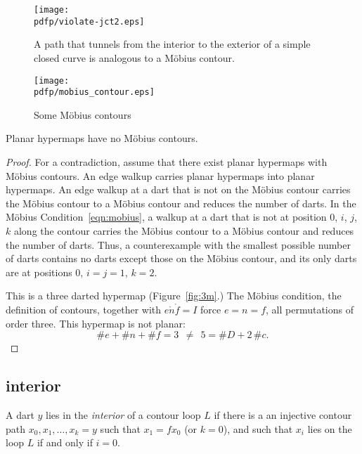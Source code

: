 \begin{figure}[htb]
  \centering
  \texttt{[image: \\pdfp/violate-jct2.eps]}
  \caption{A path that tunnels from the interior to the exterior
   of a simple closed curve
   is analogous to a M\"obius contour.}
  \label{fig:violate-jct}
\end{figure}

\begin{figure}[htb]
  \centering
  \texttt{[image: \\pdfp/mobius\_contour.eps]}
  \caption{Some M\"obius contours}
  \label{fig:mobius-contour}
\end{figure}






\begin{lemma}
Planar hypermaps have no M\"obius contours.
\end{lemma}

\begin{proof} For a contradiction, assume that there exist planar
hypermaps with M\"obius contours.  An edge walkup carries
planar hypermaps into planar hypermaps. An edge walkup
at a dart that is not on the M\"obius contour carries the
M\"obius contour to a M\"obius contour 
and reduces the number of darts.  
In the M\"obius Condition~\ref{eqn:mobius},
a walkup at a dart that is not at position $0$, $i$, $j$, $k$
along the contour carries the M\"obius contour to a M\"obius contour
and reduces the number of darts. Thus, a counterexample with
the smallest possible number of darts contains no
darts except those on the M\"obius contour, and its only darts
are at positions $0$, $i=j=1$, $k=2$.

This is a three darted hypermap (Figure~\ref{fig:3m}.)  
The M\"obius condition, the
definition of contours, together with $e\ocirc n\ocirc f=I$ force
$e=n=f$, all permutations of order three.  This hypermap is not planar:
    $$\# e + \# n + \# f = 3~~\ne~~ 5 = \# D + 2\, \#c.$$
\end{proof}



\subsection{interior}

\begin{definition}[interior]\label{def:interior} 
A dart $y$ lies in the {\it interior} of a contour
loop $L$ if there is a an injective contour path
$x_0,x_1,\ldots,x_k=y$ such that $x_1 = f x_0$ (or $k=0$), and
such that $x_i$ lies on the loop $L$ if and only if $i=0$.
\end{definition}

